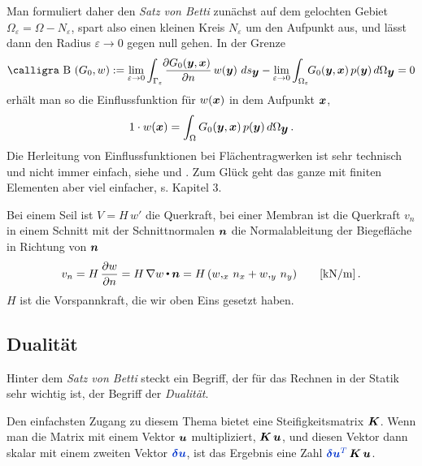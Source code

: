 Man formuliert daher den {\em Satz von Betti\/} zun\"{a}chst auf dem gelochten Gebiet $\Omega_\varepsilon = \Omega - N_\varepsilon$, spart also einen kleinen Kreis $N_\varepsilon$ um den Aufpunkt aus, und l\"{a}sst dann den Radius $\varepsilon \to 0$ gegen null gehen. In der Grenze
\begin{align}
\text{\normalfont\calligra B\,\,}(G_0,w) := \lim_{\varepsilon \to 0} \int_{\Gamma_\varepsilon} \frac{\!\!\partial G_0(\vek y,\vek x)}{\partial n}\,w(\vek y)\,\,ds_{\vek y} - \lim_{\varepsilon \to 0} \int_{\Omega_\varepsilon} \!\!G_0(\vek y,\vek x)\,p(\vek y)\,d\Omega_{\vek y} = 0
\end{align}
 erh\"{a}lt man so die Einflussfunktion f\"{u}r $w(\mbox{\boldmath $x$})$ in dem Aufpunkt $\mbox{\boldmath $x$}$,
\begin{align}
 1 \cdot w(\mbox{\boldmath $x$}) = \int_{\Omega} G_0(\mbox{\boldmath $y$},\mbox{\boldmath $x$})\,p(\mbox{\boldmath $y$})\,d\Omega_{\mbox{\boldmath $y$}}\,.
\end{align}
Die Herleitung von Einflussfunktionen bei Fl\"{a}chentragwerken ist sehr technisch und nicht immer einfach, siehe \cite{Ha2} und \cite{Ha3}. Zum Gl\"{u}ck geht das ganze mit finiten Elementen aber viel einfacher, s. Kapitel 3.\\

\begin{remark}
Bei einem Seil ist $V = H\,w'$ die Querkraft, bei einer Membran ist die Querkraft $v_n$ in einem Schnitt mit der Schnittnormalen $\mbox{\boldmath $n$}$ die Normalableitung der Biegefl\"{a}che in Richtung von $\mbox{\boldmath $n$}$
\begin{align}
v_n = H\,\frac{\partial w}{\partial n} = H\,\nabla w {\,\scriptscriptstyle \stackrel{\bullet}{{}}}\, \mbox{\boldmath $n$} = H\,(w,_x\,n_x + w,_y\,n_y)\qquad \text{[kN/m]}\,.
\end{align}
$H$ ist die Vorspannkraft, die wir oben Eins gesetzt haben.
\end{remark}

\vspace{-0.5cm}
{\textcolor{sectionTitleBlue}{\section{Dualit\"{a}t}}}
Hinter dem {\em Satz von Betti\/} steckt ein Begriff, der f\"{u}r das Rechnen in der Statik sehr wichtig ist, der Begriff der {\em Dualit\"{a}t\/}.

Den einfachsten Zugang zu diesem Thema bietet eine Steifigkeitsmatrix $\mbox{\boldmath $K$}$. Wenn man die Matrix mit einem Vektor $\mbox{\boldmath $u$}$ multipliziert, $\mbox{\boldmath $K$}\,\mbox{\boldmath $u$}$, und diesen
Vektor dann skalar mit einem zweiten Vektor $\textcolor{chapterTitleBlue}{\vek \delta \vek u} $, ist das Ergebnis eine Zahl $\textcolor{chapterTitleBlue}{\vek \delta \vek u^T}\,\vek K\,\vek u$.

